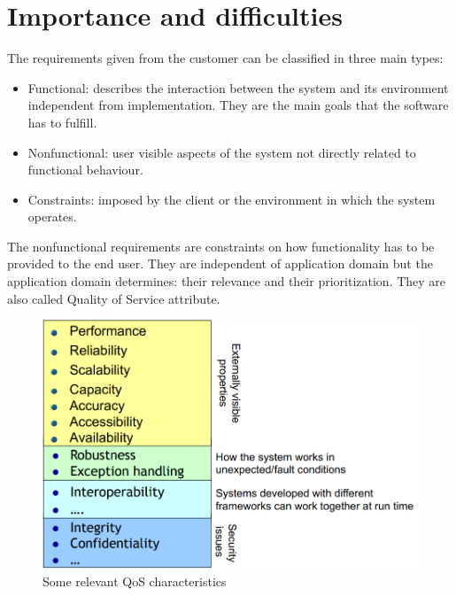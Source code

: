 \documentclass[12pt, a4paper]{report}
\newtheorem[style=M,bodystyle=\normalfont]{theorem}{Theorem}
\newtheorem[style=M,bodystyle=\normalfont]{corollary}{Corollary}
\newtheorem[style=M,bodystyle=\normalfont]{lemma}{Lemma}
\newtheorem[style=M,bodystyle=\normalfont]{definition}{Definition}
\begin{document}
\section{Importance and difficulties}
    The requirements given from the customer can be classified in three main types:
    \begin{itemize}
        \item Functional: describes the interaction between the system and its environment independent from implementation. They are the main goals that the software has to fulfill.
        \item Nonfunctional: user visible aspects of the system not directly related to functional behaviour.
        \item Constraints: imposed by the client or the environment in which the system operates.
    \end{itemize}
    The nonfunctional requirements are constraints on how functionality has to be provided to the end user. They are independent of application domain but the application domain determines: their relevance and their prioritization. They are also called Quality of Service attribute. 
    \begin{figure}
        \centering
        \includegraphics[width=1\linewidth]{images/QoS.png}
        \caption{Some relevant QoS characteristics}
    \end{figure}
\end{document}
